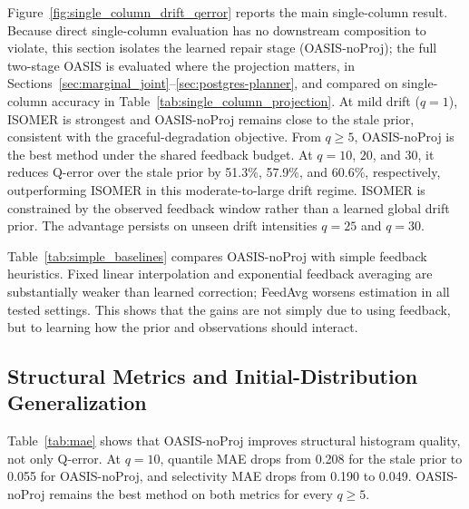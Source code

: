 \documentclass[preprint,12pt]{elsarticle}
\newcommand{\oasisUseMaxWidthResize}[1]{%
  \renewcommand{\resizebox}[3]{\adjustbox{max width=#1}{##3}}%
}
\begin{document}
Figure~\ref{fig:single_column_drift_qerror} reports the main single-column
result. Because direct single-column evaluation has no downstream composition to
violate, this section isolates the learned repair stage (OASIS-noProj); the full
two-stage OASIS is evaluated where the projection matters, in
Sections~\ref{sec:marginal_joint}--\ref{sec:postgres-planner}, and compared on
single-column accuracy in Table~\ref{tab:single_column_projection}. At mild drift
($q=1$), ISOMER is strongest and OASIS-noProj remains close to the stale prior,
consistent with the graceful-degradation objective. From $q\geq5$, OASIS-noProj
is the best method under the shared feedback budget. At $q=10$, $20$, and $30$,
it reduces Q-error over the stale prior by 51.3\%, 57.9\%, and 60.6\%,
respectively, outperforming ISOMER in this moderate-to-large drift regime.
ISOMER is constrained by the observed feedback window rather than a learned
global drift prior. The advantage persists on unseen drift intensities $q=25$
and $q=30$.

\begingroup
\oasisUseMaxWidthResize{.84\columnwidth}

\endgroup

Table~\ref{tab:simple_baselines} compares OASIS-noProj with simple feedback
heuristics. Fixed linear interpolation and exponential feedback averaging are
substantially weaker than learned correction; FeedAvg worsens estimation in
all tested settings. This shows that the gains are not simply due to using
feedback, but to learning how the prior and observations should interact.

\subsection{Structural Metrics and Initial-Distribution Generalization}
\label{sec:structural-generalization}

\begingroup
\oasisUseMaxWidthResize{.96\textwidth}

\endgroup

Table~\ref{tab:mae} shows that OASIS-noProj improves structural histogram
quality, not only Q-error. At $q=10$, quantile MAE drops from 0.208 for the stale
prior to 0.055 for OASIS-noProj, and selectivity MAE drops from 0.190 to 0.049.
OASIS-noProj remains the best method on both metrics for every $q\geq5$.

\begingroup
\oasisUseMaxWidthResize{.90\columnwidth}

\endgroup
\end{document}
